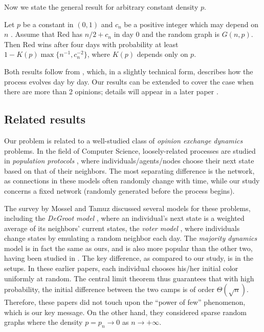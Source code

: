 \documentclass{toc}
\begin{document}
			
			Now we state the general result for arbitrary constant density $p$.
			
			\begin{theorem} \label{thm:unbounded-advantage}
				Let $p$ be a constant in $(0, 1)$ and $c_n$ be a positive integer which may depend on $n$
				.
				Assume that Red has $n/2 +c_n$ in day $0$ and the random graph is $G(n,p)$.
				Then Red wins after four days with probability at least $1 - K(p) \max \{n^{-1}, c_n^{-2} \} $, where $K(p)$ depends only on $p$.
			\end{theorem}
			
			Both  results follow from ,  which, in a slightly technical form, describes how the process evolves day by day.
			Our results can be extended to cover the case when there are more than 2 opinions; details will appear in a later paper \cite{TranVusparse}.
			
			
			\subsection{Related results}
			
			Our problem is related to a %
			well-studied  %
			class of \emph{opinion exchange dynamics} problems. In the field of Computer Science, loosely-related processes are studied in \emph{population protocols} \cite{alistarh2015, alistarh2017}, where individuals/agents/nodes choose their next state based on that of their neighbors. The most separating difference is the network, as connections in these models often randomly change with time, while our study concerns a fixed network (randomly generated before the process begins).
			
			The survey by Mossel and Tamuz \cite{mossel2017} discussed %
			several  %
			models for these problems, including the \emph{DeGroot model} \cite{degroot1974}, where an individual's next state is a weighted average of its neighbors' current states, the \emph{voter model} \cite{clifford1973}, where individuals change states by emulating a random neighbor each day. The \emph{majority dynamics} model is in fact the same as ours, and is also more popular than the other two, having been studied in \cite{mossel2014, fountoulakis, benjamini}. The key difference, as compared to our study,  is in the %
			setups.  %
			In these earlier papers, each individual chooses his/her initial color uniformly at random. The central limit theorem thus guarantees that with high probability, the initial difference between the two camps is of order $\Theta (\sqrt n) $. Therefore, these papers did not touch upon the ``power of few'' phenomenon, which is our key message. On the other hand,  they considered sparse random graphs where the density $p = p_n\to 0$ as $n \to +\infty$.
			
\end{document}

